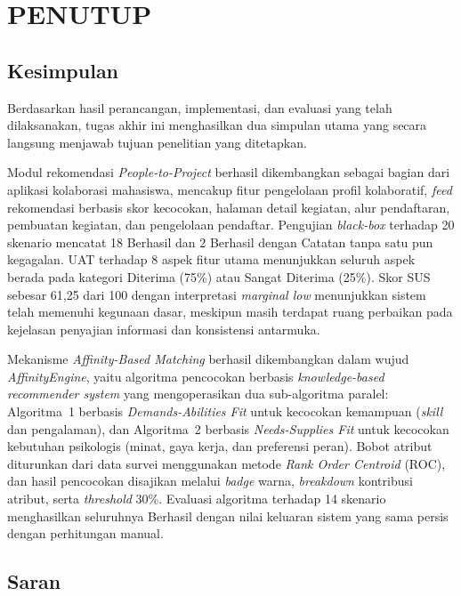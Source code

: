 \cleardoublepage
\chapter{PENUTUP}
\label{chap:penutup}

\section{Kesimpulan}

Berdasarkan hasil perancangan, implementasi, dan evaluasi yang telah dilaksanakan, tugas akhir ini menghasilkan dua simpulan utama yang secara langsung menjawab tujuan penelitian yang ditetapkan.

Modul rekomendasi \emph{People-to-Project} berhasil dikembangkan sebagai bagian dari aplikasi kolaborasi mahasiswa, mencakup fitur pengelolaan profil kolaboratif, \emph{feed} rekomendasi berbasis skor kecocokan, halaman detail kegiatan, alur pendaftaran, pembuatan kegiatan, dan pengelolaan pendaftar. Pengujian \emph{black-box} terhadap 20 skenario mencatat 18 Berhasil dan 2 Berhasil dengan Catatan tanpa satu pun kegagalan. UAT terhadap 8 aspek fitur utama menunjukkan seluruh aspek berada pada kategori Diterima (75\%) atau Sangat Diterima (25\%). Skor SUS sebesar 61,25 dari 100 dengan interpretasi \emph{marginal low} menunjukkan sistem telah memenuhi kegunaan dasar, meskipun masih terdapat ruang perbaikan pada kejelasan penyajian informasi dan konsistensi antarmuka.

Mekanisme \emph{Affinity-Based Matching} berhasil dikembangkan dalam wujud \emph{AffinityEngine}, yaitu algoritma pencocokan berbasis \emph{knowledge-based recommender system} yang mengoperasikan dua sub-algoritma paralel: Algoritma~1 berbasis \emph{Demands-Abilities Fit} untuk kecocokan kemampuan (\emph{skill} dan pengalaman), dan Algoritma~2 berbasis \emph{Needs-Supplies Fit} untuk kecocokan kebutuhan psikologis (minat, gaya kerja, dan preferensi peran). Bobot atribut diturunkan dari data survei menggunakan metode \emph{Rank Order Centroid} (ROC), dan hasil pencocokan disajikan melalui \emph{badge} warna, \emph{breakdown} kontribusi atribut, serta \emph{threshold} 30\%. Evaluasi algoritma terhadap 14 skenario menghasilkan seluruhnya Berhasil dengan nilai keluaran sistem yang sama persis dengan perhitungan manual.

\section{Saran}

